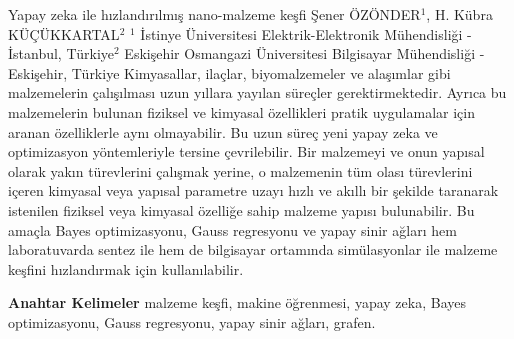 
    \begin{abstract_online}{Yapay zeka ile hızlandırılmış nano-malzeme keşfi}{%
        Şener ÖZÖNDER$^{1}$, H. Kübra KÜÇÜKKARTAL$^{2}$}{%
        }{%
        $^1$ İstinye Üniversitesi Elektrik-Elektronik Mühendisliği - İstanbul, Türkiye\newline{}$^2$ Eskişehir Osmangazi Üniversitesi Bilgisayar Mühendisliği - Eskişehir, Türkiye}
    Kimyasallar, ilaçlar, biyomalzemeler ve alaşımlar gibi malzemelerin çalışılması uzun yıllara yayılan süreçler gerektirmektedir. Ayrıca bu malzemelerin bulunan fiziksel ve kimyasal özellikleri pratik uygulamalar için aranan özelliklerle aynı olmayabilir. Bu uzun süreç yeni yapay zeka ve optimizasyon yöntemleriyle tersine çevrilebilir. Bir malzemeyi ve onun yapısal olarak yakın türevlerini çalışmak yerine, o malzemenin tüm olası türevlerini içeren kimyasal veya yapısal parametre uzayı hızlı ve akıllı bir şekilde taranarak istenilen fiziksel veya kimyasal özelliğe sahip malzeme yapısı bulunabilir. Bu amaçla Bayes optimizasyonu, Gauss regresyonu ve yapay sinir ağları hem laboratuvarda sentez ile hem de bilgisayar ortamında simülasyonlar ile malzeme keşfini hızlandırmak için kullanılabilir. 
    
            \textbf{Anahtar Kelimeler} \newline{}malzeme keşfi, makine öğrenmesi, yapay zeka, Bayes optimizasyonu, Gauss regresyonu, yapay sinir ağları, grafen.
    \end{abstract_online}
    